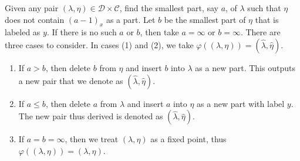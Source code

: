 \documentclass[11pt,reqno]{amsart}
\numberwithin{equation}{section}
\theoremstyle{plain}
\theoremstyle{definition}
\theoremstyle{named}
\def\cD{\mathcal{D}}
\def\cC{\mathcal{C}}
\def\la{\lambda}
\begin{document}
Given any pair $(\la,\eta)\in\cD\times\cC$, find the smallest part, say $a$, of $\la$ such that $\eta$ does not contain $(a-1)_{x}$ as a part. Let $b$ be the smallest part of $\eta$ that is labeled as $y$. If there is no such $a$ or $b$, then take $a=\infty$ or $b=\infty$. There are three cases to consider. In cases (1) and (2), we take $\varphi((\la,\eta))=(\hat{\la},\hat{\eta})$.










\begin{enumerate}
\item If $a>b$, then delete $b$ from $\eta$ and insert $b$ into $\la$ as a new part. This outputs a new pair that we denote as $(\hat{\la}, \hat{\eta})$.

\item If $a\leq b$, then delete $a$ from $\la$ and insert $a$ into $\eta$ as a new part with label $y$. The new pair thus derived is denoted as $(\hat{\la}, \hat{\eta})$.

\item If $a=b=\infty$, then we treat $(\la,\eta)$ as a fixed point, thus $\varphi((\la,\eta))=(\la,\eta)$.
\end{enumerate}
\end{document}
